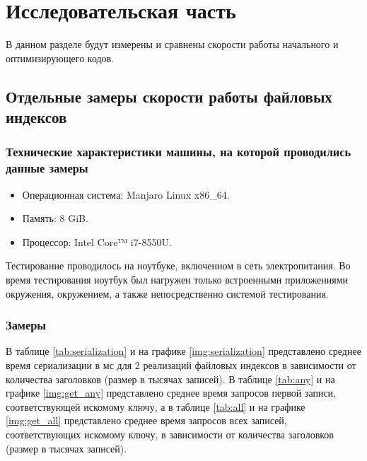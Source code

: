 \chapter{Исследовательская часть}

В данном разделе будут измерены и сравнены скорости работы начального и оптимизирующего кодов.

\section{Отдельные замеры скорости работы файловых индексов}

\subsection{Технические характеристики машины, на которой проводились данные замеры}

\begin{itemize}
	\item Операционная система: Manjaro \cite{manjaro} Linux \cite{linux} x86\_64.
	\item Память: 8 GiB.
	\item Процессор: Intel Core™ i7-8550U\cite{intel}.
\end{itemize}

Тестирование проводилось на ноутбуке, включенном в сеть электропитания. Во время тестирования ноутбук был нагружен только встроенными приложениями окружения, окружением, а также непосредственно системой тестирования.

\subsection{Замеры}

В таблице \ref{tab:serialization} и на графике \ref{img:serialization} представлено среднее время сериализации в мс для 2 реализаций файловых индексов в зависимости от количества заголовков (размер в тысячах записей). В таблице \ref{tab:any} и на графике \ref{img:get_any} представлено среднее время запросов первой записи, соответствующей искомому ключу, а в таблице \ref{tab:all} и на графике \ref{img:get_all} представлено среднее время запросов всех записей, соответствующих искомому ключу, в зависимости от количества заголовков (размер в тысячах записей).

